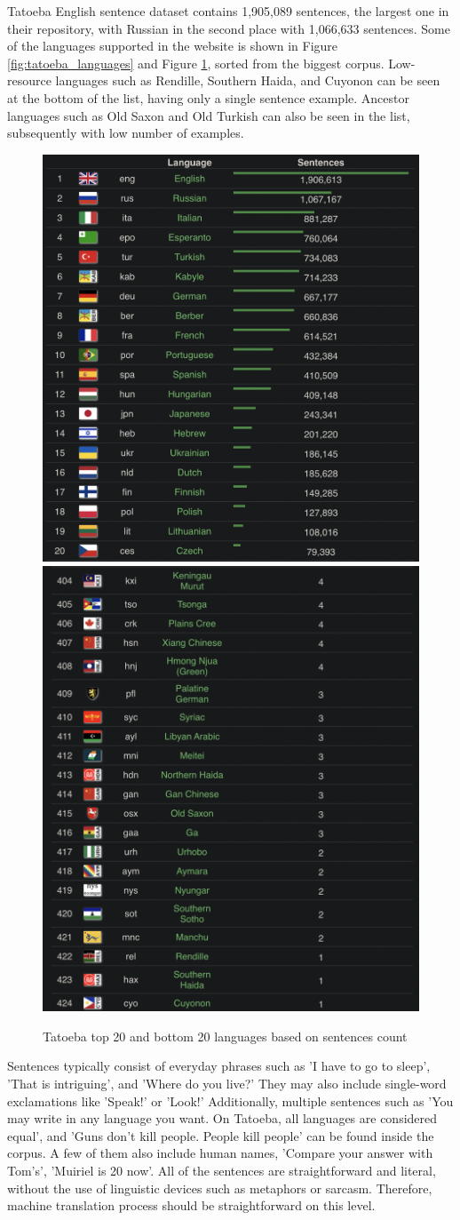 \documentclass[a4paper]{article}
\begin{document}
Tatoeba English sentence dataset contains 1,905,089 sentences, the largest one in their repository, with Russian in the second place with 1,066,633 sentences. Some of the languages supported in the website is shown in Figure \ref{fig:tatoeba_languages} and Figure \ref{fig:tatoeba_top_bottom_languages}, sorted from the biggest corpus. Low-resource languages such as Rendille, Southern Haida, and Cuyonon can be seen at the bottom of the list, having only a single sentence example. Ancestor languages such as Old Saxon and Old Turkish can also be seen in the list, subsequently with low number of examples.

\begin{figure}[htbp]
    \centering
    \includegraphics[width=0.5\linewidth]{images/tatoeba_top_20_lang.png}
    \includegraphics[width=0.46\linewidth]{images/tatoeba_bottom_20_lang.png}
    \caption{Tatoeba top 20 and bottom 20 languages based on sentences count \cite{tatoeba}}
    \label{fig:tatoeba_top_bottom_languages}
\end{figure}

Sentences typically consist of everyday phrases such as 'I have to go to sleep', 'That is intriguing', and 'Where do you live?' They may also include single-word exclamations like 'Speak!' or 'Look!' Additionally, multiple sentences such as 'You may write in any language you want. On Tatoeba, all languages are considered equal', and 'Guns don't kill people. People kill people' can be found inside the corpus. A few of them also include human names, 'Compare your answer with Tom's', 'Muiriel is 20 now'. All of the sentences are straightforward and literal, without the use of linguistic devices such as metaphors or sarcasm. Therefore, machine translation process should be straightforward on this level.
\end{document}
